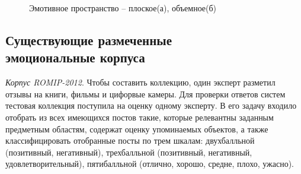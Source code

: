 \begin{figure}[H]
	\centering
	
	 \newline
	\caption{Эмотивное пространство -- плоское(а), объемное(б)}
\end{figure}

\subsection[Существующие размеченные эмоциональные корпуса]{Существующие размеченные\\эмоциональные корпуса}
\textit{Корпус ROMIP-2012}. \cite{Chetviorkin2012} Чтобы составить коллекцию, один эксперт разметил отзывы на книги, фильмы и цифорвые камеры. Для проверки ответов систем тестовая коллекция поступила на оценку одному эксперту.  В его задачу входило отобрать из всех имеющихся постов  такие, которые релевантны заданным предметным областям, содержат оценку упоминаемых объектов, а также классифицировать отобранные посты по трем шкалам: двухбалльной (позитивный, негативный), трехбалльной (позитивный, негативный, удовлетворительный), пятибалльной (отлично, хорошо, средне, плохо, ужасно).

